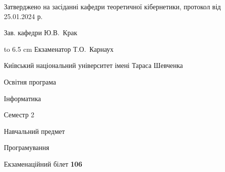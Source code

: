 \documentclass[12pt, ukrainian]{article}
\begin{document}
{\smallskip\smallskip \begin {scriptsize} Затверджено на засіданні кафедри теоретичної кібернетики, протокол   від   25.01.2024 р.\par\smallskip\smallskip\smallskip\smallskip
{\parbox {6.5 cm} {Зав. кафедри \dotfill Ю.В.~Крак}}\hspace {0.7cm} {\hbox to 6.5 cm { Екзаменатор \dotfill Т.О.~Карнаух}} \end{scriptsize}}
\newpage
{{\begin {scriptsize}\par
{ \center  Київський національний університет імені Тараса Шевченка \par}
{\parbox {5 cm}{Освітня програма \hfill}{\parbox {7 cm}{Інформатика\hfill}}\parbox {6 cm}{\hfill Семестр 2}}\par
{\parbox {5 cm} {Навчальний предмет \hfill}\parbox {7 cm}{Програмування \hfill}\parbox {6cm}{\hfill}\par}\vspace{-15pt} \end{scriptsize}}{\center Екзаменаційний білет \No \textbf { 106 }\par}}
\end{document}
